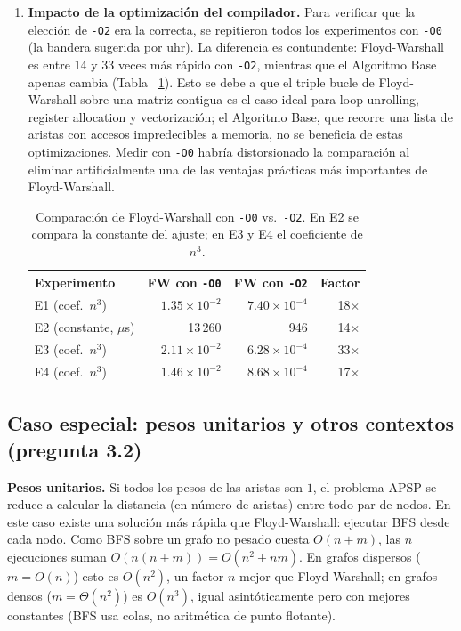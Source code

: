 \documentclass[11pt]{article}
\begin{document}
\begin{enumerate}
  \item \textbf{Impacto de la optimización del compilador.} Para verificar
  que la elección de \texttt{-O2} era la correcta, se repitieron todos los
  experimentos con \texttt{-O0} (la bandera sugerida por uhr). La diferencia
  es contundente: Floyd-Warshall es entre 14 y 33 veces más rápido con
  \texttt{-O2}, mientras que el Algoritmo Base apenas cambia (Tabla~%
  \ref{tab:o2vso0}). Esto se debe a que el triple bucle de Floyd-Warshall
  sobre una matriz contigua es el caso ideal para loop unrolling, register
  allocation y vectorización; el Algoritmo Base, que recorre una lista de
  aristas con accesos impredecibles a memoria, no se beneficia de estas
  optimizaciones. Medir con \texttt{-O0} habría distorsionado la comparación
  al eliminar artificialmente una de las ventajas prácticas más importantes
  de Floyd-Warshall.

  \begin{table}[ht]
  \centering
  \begin{tabular}{lrrr}
  \toprule
  Experimento & FW con \texttt{-O0} & FW con \texttt{-O2} & Factor \\
  \midrule
  E1 (coef.\ $n^3$)            & $1.35\times10^{-2}$ & $7.40\times10^{-4}$ & 18$\times$ \\
  E2 (constante, $\mu$s)       & 13\,260 & 946    & 14$\times$ \\
  E3 (coef.\ $n^3$)            & $2.11\times10^{-2}$ & $6.28\times10^{-4}$ & 33$\times$ \\
  E4 (coef.\ $n^3$)            & $1.46\times10^{-2}$ & $8.68\times10^{-4}$ & 17$\times$ \\
  \bottomrule
  \end{tabular}
  \caption{Comparación de Floyd-Warshall con \texttt{-O0} vs.\ \texttt{-O2}.
  En E2 se compara la constante del ajuste; en E3 y E4 el coeficiente de
  $n^3$.}
  \label{tab:o2vso0}
  \end{table}
\end{enumerate}

\subsection{Caso especial: pesos unitarios y otros contextos (pregunta 3.2)}

\textbf{Pesos unitarios.} Si todos los pesos de las aristas son $1$, el
problema APSP se reduce a calcular la distancia (en número de aristas) entre
todo par de nodos. En este caso existe una solución más rápida que
Floyd-Warshall: ejecutar BFS desde cada nodo. Como BFS sobre un grafo no
pesado cuesta $O(n+m)$, las $n$ ejecuciones suman $O(n(n+m))=O(n^2+nm)$.
En grafos dispersos ($m=O(n)$) esto es $O(n^2)$, un factor $n$ mejor que
Floyd-Warshall; en grafos densos ($m=\Theta(n^2)$) es $O(n^3)$, igual
asintóticamente pero con mejores constantes (BFS usa colas, no aritmética de
punto flotante).
\end{document}
